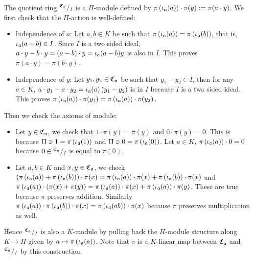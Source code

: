 \begin{construction}\label{con:cross-product-simple-ring-mod}
  The quotient ring ${}^{\operatorname{\mathfrak{C}}_{\mathfrak{a}}}/_{I}$ is a $\Pi$-module defined by $\pi\left(\iota_{\mathfrak{a}}(a)\right)\cdot \pi(y) := \pi(a \cdot y)$. We first check that the $\Pi$-action is well-defined:
  \begin{itemize}
    \item Independence of $a$: Let $a, b \in K$ be such that $\pi\left(\iota_{\mathfrak{a}}(a)\right) = \pi\left(\iota_{\mathfrak{a}}(b)\right)$, that is, $\iota_{\mathfrak{a}}(a-b)\in I$. Since $I$ is a two sided ideal, $a\cdot y - b \cdot y = (a - b)\cdot y = \iota_{\mathfrak{a}}(a - b) y$ is also in $I$. This proves $\pi(a\cdot y) = \pi(b\cdot y)$.
    \item Independence of $y$: Let $y_{1},y_{2}\in\operatorname{\mathfrak{C}}_{\mathfrak{a}}$ be such that $y_{1}-y_{2}\in I$, then for any $a \in K$, $a \cdot y_{1} - a \cdot y_{2} = \iota_{\mathfrak{a}}(a)\left(y_{1}-y_{2}\right)$ is in $I$ because $I$ is a two sided ideal. This proves $\pi\left(\iota_{\mathfrak{a}}(a)\right)\cdot \pi(y_{1}) = \pi\left(\iota_{\mathfrak{a}}(a)\right)\cdot \pi(y_{2})$.
  \end{itemize}
  Then we check the axioms of module:
  \begin{itemize}
    \item Let $y \in \operatorname{\mathfrak{C}}_{\mathfrak{a}}$, we check that $1 \cdot \pi(y) = \pi(y)$ and $0 \cdot \pi(y) = 0$. This is because $\Pi\ni 1 = \pi\left(\iota_{\mathfrak{a}}(1)\right)$ and $\Pi\ni 0=\pi\left(\iota_{\mathfrak{a}}(0)\right)$. Let $a \in K$, $\pi\left(\iota_{\mathfrak{a}}(a)\right)\cdot 0 = 0$ because $0 \in {}^{\operatorname{\mathfrak{C}}_{\mathfrak{a}}}/_{I}$ is equal to $\pi(0)$.
    \item Let $a, b \in K$ and $x, y \in \operatorname{\mathfrak{C}}_{\mathfrak{a}}$, we check $\left(\pi\left(\iota_{\mathfrak{a}}(a)\right) + \pi\left(\iota_{\mathfrak{a}}(b)\right)\right)\cdot \pi(x) = \pi\left(\iota_{\mathfrak{a}}(a)\right)\cdot\pi(x) + \pi\left(\iota_{\mathfrak{a}}(b)\right)\cdot \pi(x)$ and $\pi\left(\iota_{\mathfrak{a}}(a)\right)\cdot(\pi(x)+\pi(y)) = \pi\left(\iota_{\mathfrak{a}}(a)\right)\cdot\pi(x) + \pi\left(\iota_{\mathfrak{a}}(a)\right)\cdot\pi(y)$. These are true because $\pi$ preserves addition. Similarly $\pi\left(\iota_{\mathfrak{a}}(a)\right)\cdot \pi\left(\iota_{\mathfrak{a}}(b)\right) \cdot \pi(x) = \pi\left(\iota_{\mathfrak{a}}(ab)\right)\cdot \pi(x)$ because $\pi$ preserves multiplication as well.
  \end{itemize}

  Hence ${}^{\operatorname{\mathfrak{C}}_{\mathfrak{a}}}/_{I}$ is also a $K$-module by pulling back the $\Pi$-module structure along $K \to \Pi$ given by $a \mapsto \pi\left(\iota_{\mathfrak{a}}(a)\right)$. Note that $\pi$ is a $K$-linear map between $\operatorname{\mathfrak{C}}_{\mathfrak{a}}$ and ${}^{\operatorname{\mathfrak{C}}_{\mathfrak{a}}}/_{I}$ by this construction.
  \leanok
\end{construction}

